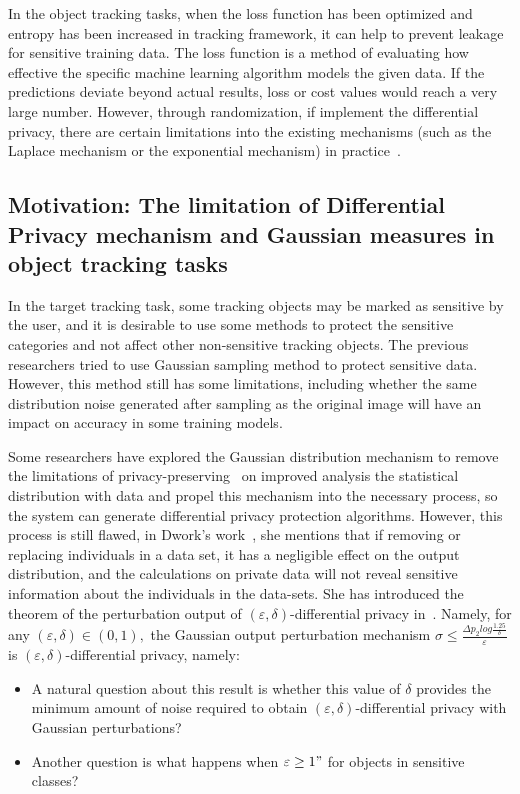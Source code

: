 \documentclass[journal,transmag]{IEEEtran}
\begin{document}
In the object tracking tasks, when the loss function has been optimized and entropy has been increased in tracking framework, it can help to prevent leakage for sensitive training data. The loss function is a method of evaluating how effective the specific machine learning algorithm models the given data. If the predictions deviate beyond actual results, loss or cost values would reach a very large number. However, through randomization, if implement the differential privacy, there are certain limitations into the existing mechanisms (such as the Laplace mechanism or the exponential mechanism) in practice~\cite{koufogiannis2015optimality}. 


\subsection{Motivation: The limitation of Differential Privacy mechanism and Gaussian measures in object tracking tasks}
In the target tracking task, some tracking objects may be marked as sensitive by the user, and it is desirable to use some methods to protect the sensitive categories and not affect other non-sensitive tracking objects. The previous researchers tried to use Gaussian sampling method to protect sensitive data. However, this method still has some limitations, including whether the same distribution noise generated after sampling as the original image will have an impact on accuracy in some training models.

Some researchers have explored the Gaussian distribution mechanism to remove the limitations of privacy-preserving~\cite{liu2018generalized} on improved analysis the statistical distribution with data and propel this mechanism into the necessary process, so the system can generate differential privacy protection algorithms. However, this process is still flawed, in Dwork’s work~\cite{dwork2009complexity}, she mentions that if removing or replacing individuals in a data set, it has a negligible effect on the output distribution, and the calculations on private data will not reveal sensitive information about the individuals in the data-sets. She has introduced the theorem of the perturbation output of $(\varepsilon,\delta)$-differential privacy in~\cite{dwork2009complexity}. Namely, for any $(\varepsilon,\delta)\in (0,1),$ the Gaussian output perturbation mechanism $\sigma \leq \frac{\Delta p_2 log\frac{1.25}{\delta}}{\varepsilon}$  is $(\varepsilon,\delta)$-differential privacy, namely: 
\begin{itemize}
    \item A natural question about this result is whether this value of $\delta$ provides the minimum amount of noise required to obtain $(\varepsilon,\delta)$-differential privacy with Gaussian perturbations?
	\item Another question is what happens when $\varepsilon \geq 1"$ for objects in sensitive classes?  
\end{itemize}
\end{document}

